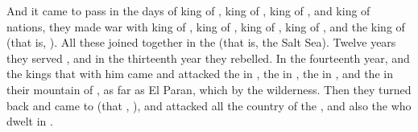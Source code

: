 
\bverse And it came to pass in the days of  king of ,  king of ,  king of , and  king of nations, 
\bverse \that they made war with  king of ,  king of ,  king of ,  king of , and the king of  (that is, ).
\bverse All these joined together in the  (that is, the Salt Sea).
\bverse Twelve years they served , and in the thirteenth year they rebelled.
\bverse In the fourteenth year,  and the kings that \were with him came and attacked the  in , the  in , the  in ,
\bverse and the  in their mountain of , as far as El Paran, which \is by the wilderness.
\bverse Then they turned back and came to  (that \is, ), and attacked all the country of the , and also the  who dwelt in .


